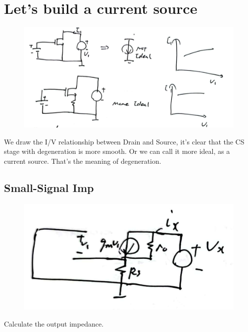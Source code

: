 \documentclass[fontset=windows]{article}
\begin{document}
\section*{Let's build a current source}

\begin{figure}[htbp]
    \centering
    \includegraphics[scale=0.6]{5.jpg}
    \captionsetup{labelformat=empty}
    \caption{}
    \label{5}
\end{figure}

We draw the I/V relationship between Drain and Source, it's clear that the CS stage with degeneration is more smooth. 
Or we can call it more ideal, as a current source. That's the meaning of degeneration. 

\subsection*{Small-Signal Imp}

\begin{figure}[htbp]
    \centering
    \includegraphics[scale=0.8]{6.jpg}
    \captionsetup{labelformat=empty}
    \caption{}
    \label{6}
\end{figure}

Calculate the output impedance. 
\end{document}
